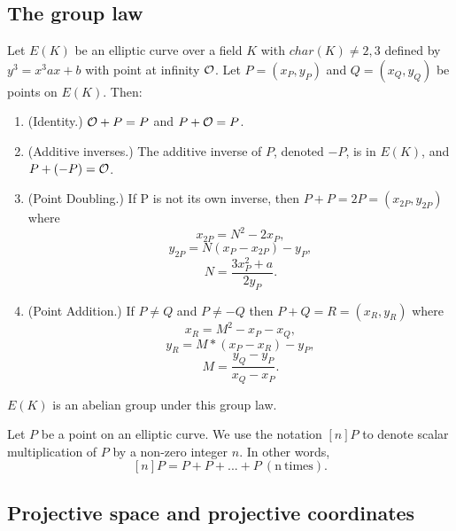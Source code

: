 \subsection{The group law}
\begin{defn} Let $E(K)$ be an elliptic curve over a field $K$ with $char(K) \neq 2, 3$ defined by $y^3 =x^3  ax + b$ with point at infinity $\mathcal{O}$. Let
 $P = (x_P, y_P)$ and $Q = (x_Q, y_Q)$ be points on $E(K)$. Then:
\begin{enumerate}
\item(Identity.)
$\mathcal{O} + P = P$ and $P + \mathcal{O} = P$.
\item(Additive inverses.)
The additive inverse of $P$, denoted $-P$, is in $E(K)$, and
$P + (-P) = \mathcal{O}$.
\item{(Point Doubling.)}
If P is not its own inverse, then $P + P = 2P = (x_{2P}, y_{2P})$ where
$$x_{2P} = N^2 - 2 x_P, $$
$$y_{2P} = N(x_P - x_{2P}) - y_P,$$
$$N = \frac{3x_P^2 + a}{2y_P}.$$
\item(Point Addition.)
If  $P \neq Q$ and $P \neq -Q$ then
$P + Q = R = (x_{R}, y_{R})$ where
$$x_{R} = M^2 - x_P - x_Q,$$
$$y_{R} = M * (x_P - x_{R}) - y_P,$$
 $$M = \frac{y_Q - y_P}{x_Q - x_P}.$$

\end{enumerate}

\end{defn}$E(K)$ is an abelian group under this group law.
\begin{note}
Let $P$ be a point on an elliptic curve. We use the notation $[n]P$ to denote scalar multiplication of $P$ by a non-zero integer $n$. In other words, $$[n]P = P + P + ... + P \  \mathrm{(n \ times)}.$$
\end{note}

\subsection{Projective space and projective coordinates}


